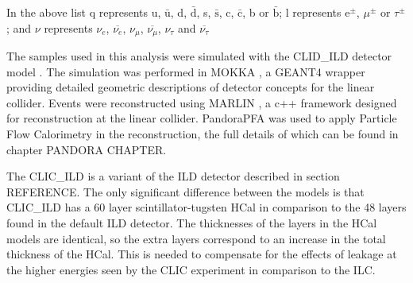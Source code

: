 \noindent In the above list q represents u, $\bar{\text{u}}$, d, $\bar{\text{d}}$, s, $\bar{\text{s}}$, c, $\bar{\text{c}}$, b or $\bar{\text{b}}$;  l represents $\text{e}^{\pm}$, $\mu^{\pm}$ or $\tau^{\pm}$; and $\nu$ represents $\nu_{e}$, $\overline{\nu_{e}}$, $\nu_{\mu}$, $\overline{\nu_{\mu}}$, $\nu_{\tau}$ and $\overline{\nu_{\tau}}$

The samples used in this analysis were simulated with the CLID\_ILD detector model \cite{arXiv:1006.3396}.  The simulation was performed in MOKKA \cite{MoradeFreitas:2002kj}, a GEANT4 \cite{Agostinelli:2002hh} wrapper providing detailed geometric descriptions of detector concepts for the linear collider.  Events were reconstructed using MARLIN \cite{Gaede:2006pj}, a c++ framework designed for reconstruction at the linear collider.  PandoraPFA \cite{arXiv:0907.3577, arXiv:1209.4039} was used to apply Particle Flow Calorimetry in the reconstruction, the full details of which can be found in chapter PANDORA CHAPTER.
 
The CLIC\_ILD is a variant of the ILD detector described in section REFERENCE.  The only significant difference between the models is that CLIC\_ILD has a 60 layer scintillator-tugsten HCal in comparison to the 48 layers found in the default ILD detector.  The thicknesses of the layers in the HCal models are identical, so the extra layers correspond to an increase in the total thickness of the HCal.  This is needed to compensate for the effects of leakage at the higher energies seen by the CLIC experiment in comparison to the ILC. 

